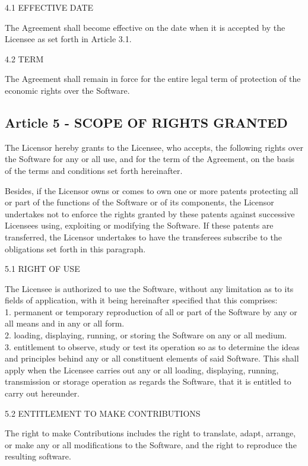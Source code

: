 4.1 EFFECTIVE DATE

The Agreement shall become effective on the date when it is accepted by the Licensee as set forth in Article 3.1.

4.2 TERM

The Agreement shall remain in force for the entire legal term of protection of the economic rights over the Software.

\subsection*{Article 5 - SCOPE OF RIGHTS GRANTED}

The Licensor hereby grants to the Licensee, who accepts, the following rights over the Software for any or all use, and for the term of the Agreement, on the basis of the terms and conditions set forth hereinafter.

Besides, if the Licensor owns or comes to own one or more patents protecting all or part of the functions of the Software or of its components, the Licensor undertakes not to enforce the rights granted by these patents against successive Licensees using, exploiting or modifying the Software. If these patents are transferred, the Licensor undertakes to have the transferees subscribe to the obligations set forth in this paragraph.

5.1 RIGHT OF USE

The Licensee is authorized to use the Software, without any limitation as to its fields of application, with it being hereinafter specified that this comprises:\\
1. permanent or temporary reproduction of all or part of the Software by any or all means and in any or all form.\\
2. loading, displaying, running, or storing the Software on any or all medium.\\
3. entitlement to observe, study or test its operation so as to determine the ideas and principles behind any or all constituent elements of said Software. This shall apply when the Licensee carries out any or all loading, displaying, running, transmission or storage operation as regards the Software, that it is entitled to carry out hereunder.

5.2 ENTITLEMENT TO MAKE CONTRIBUTIONS

The right to make Contributions includes the right to translate, adapt, arrange, or make any or all modifications to the Software, and the right to reproduce the resulting software.


